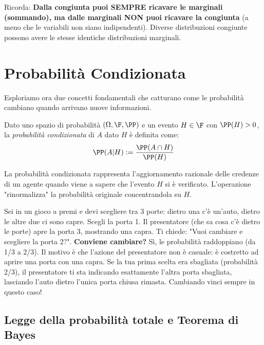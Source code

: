 \begin{hint}
    Ricorda: \textbf{Dalla congiunta puoi SEMPRE ricavare le marginali (sommando), ma dalle marginali NON puoi ricavare la congiunta} (a meno che le variabili non siano indipendenti). Diverse distribuzioni congiunte possono avere le stesse identiche distribuzioni marginali.
\end{hint}

\section{Probabilità Condizionata}

Esploriamo ora due concetti fondamentali che catturano come le probabilità cambiano quando arrivano nuove informazioni.

\begin{definition}
Dato uno spazio di probabilità $(\Omega, \F, \PP)$ e un evento $H \in \F$ con $\PP(H) > 0$, la \emph{probabilità condizionata} di $A$ dato $H$ è definita come:
\[ \PP(A|H) := \frac{\PP(A \cap H)}{\PP(H)} \]
\end{definition}

La probabilità condizionata rappresenta l'aggiornamento razionale delle credenze di un agente quando viene a sapere che l'evento $H$ si è verificato. L'operazione "rinormalizza" la probabilità originale concentrandola su $H$.

\begin{esempio}
Sei in un gioco a premi e devi scegliere tra 3 porte: dietro una c'è un'auto, dietro le altre due ci sono capre. Scegli la porta 1. Il presentatore (che sa cosa c'è dietro le porte) apre la porta 3, mostrando una capra. Ti chiede: "Vuoi cambiare e scegliere la porta 2?".
\textbf{Conviene cambiare?}
Sì, le probabilità raddoppiano (da 1/3 a 2/3). Il motivo è che l'azione del presentatore non è casuale: è costretto ad aprire una porta con una capra. Se la tua prima scelta era sbagliata (probabilità 2/3), il presentatore ti sta indicando esattamente l'altra porta sbagliata, lasciando l'auto dietro l'unica porta chiusa rimasta. Cambiando vinci sempre in questo caso!
\end{esempio}

\subsection{Legge della probabilità totale e Teorema di Bayes}

